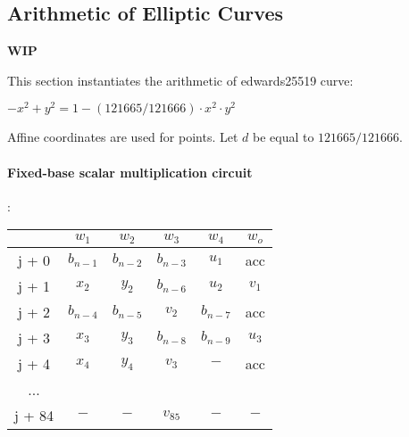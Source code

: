 \subsection{Arithmetic of Elliptic Curves} \label{ellcurve}
\textbf{WIP}

This section instantiates the arithmetic of edwards25519 curve:
\begin{center}
$- x^2 + y^2 = 1 - (121665/121666) \cdot x^2 \cdot y^2$
\end{center}
Affine coordinates are used for points. 
Let $d$ be equal to $121665/121666$.

\paragraph{Fixed-base scalar multiplication circuit}:
\begin{center}
\begin{tabular}{ c|c|c|c|c|c } 
  & $w_1$ & $w_2$ & $w_3$ & $w_4$ & $w_o$\\ 
 \hline
j + 0 & $b_{n - 1}$ & $b_{n - 2}$ & $b_{n - 3}$ & $u_1$ & acc\\ 
j + 1 & $x_2$ & $y_2$ & $b_{n - 6}$ & $u_2$ & $v_1$\\ 
j + 2 & $b_{n - 4}$ & $b_{n - 5}$ & $v_2$ & $b_{n - 7}$ & acc\\ 
j + 3 & $x_3$ & $ y_3$ & $b_{n - 8}$ & $b_{n - 9}$ & $u_3$\\ 
j + 4 & $x_4$ & $y_4$ & $v_3$ & $-$ & acc\\ 
... & & & & &\\ 
j + 84 & $-$ & $-$ & $v_{85}$ & $-$ & $-$ \\ 
\end{tabular}
\end{center}

